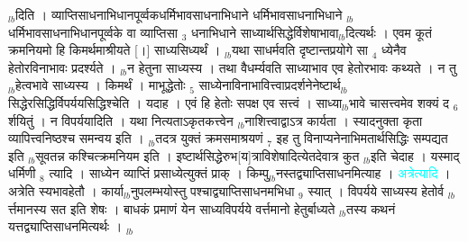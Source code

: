 \documentclass[article,12pt,a4paper]{memoir}%
\newcommand{\quotelemma}[1]{\textcolor{cyan}{#1}}
\newcounter{parCount}
\begin{document}
\cite[1b3]{vn-msN} {\tiny $_{lb}$}दिति । व्याप्तिसाधनाभिधानपूर्व्वकधर्मिभावसाधनाभिधाने धर्मिभावसाधनाभिधाने {\tiny $_{lb}$}धर्मिभावसाधनाभिधानपूर्व्वके वा व्याप्तिसा {\tiny $_{3}$} धनाभिधाने साध्यार्थसिद्धेर्विशेषाभावा{\tiny $_{lb}$}दित्यर्थः । एवम कूतं क्रमनियमो हि किमर्थमाश्रीयते [।] साध्यसिध्यर्थं । {\tiny $_{lb}$}यथा साधर्मवति दृष्टान्तप्रयोगे सा {\tiny $_{4}$} ध्येनैव हेतोरविनाभावः प्रदर्श्यते । {\tiny $_{lb}$}न हेतुना साध्यस्य । तथा वैधर्म्यवति साध्याभाव एव हेतोरभावः कथ्यते । न तु {\tiny $_{lb}$}हेत्वभावे साध्यस्य । किमर्थं । माभूद्धेतोः {\tiny $_{5}$} साध्येनाविनाभावित्त्वाप्रदर्शनेनेष्टार्थ{\tiny $_{lb}$}सिद्धेरसिद्धिर्विपर्ययसिद्धिश्चेति । यदाह । एवं हि हेतोः सपक्ष एव सत्त्वं । साध्या{\tiny $_{lb}$}भावे चासत्त्वमेव शक्यं द {\tiny $_{6}$} र्शयितुं । न विपर्ययादिति । यथा नित्यताऽकृतकत्त्वेन {\tiny $_{lb}$}नाशित्त्वाद्वाऽत्र कार्यता । स्यादनुक्ता कृता व्यापित्त्वनिष्ठश्च समन्वय इति । {\tiny $_{lb}$}तदत्र युक्तं क्रमसमाश्रयणं {\tiny $_{7}$} इह तु विनाप्यनेनाभिमतार्थसिद्धिः सम्पद्यत इति {\tiny $_{lb}$}सूवतन्न कश्चित्क्रमनियम इति । इष्टार्थसिद्धेरुभ[य]त्राविशेषादित्येतदेवात्र कुत {\tiny $_{lb}$}इति चेदाह । यस्माद् धर्मिणी {\tiny $_{8}$} त्यादि । साध्येन व्याप्तिं प्रसाध्येत्युक्तं प्राक् । किम्पु{\tiny $_{lb}$}नस्तद्व्याप्तिसाधनमित्याह । \quotelemma{अत्रेत्यादि} \cite[1b3]{vn-msN} । अत्रेति स्यभावहेतौ । कार्या{\tiny $_{lb}$}नुपलम्भयोस्तु पश्चाद्व्याप्तिसाधनमभिधा {\tiny $_{9}$} \leavevmode{} स्यात् । विपर्यये साध्यस्य हेतोर्व {\tiny $_{lb}$}र्त्तमानस्य सत इति शेषः । बाधकं प्रमाणं येन साध्यविपर्यये वर्त्तमानो हेतुर्बाध्यते {\tiny $_{lb}$}तस्य कथनं यत्तद्व्याप्तिसाधनमित्यर्थः ।
	{}
	\pend%
      {\tiny $_{lb}$}
\end{document}
